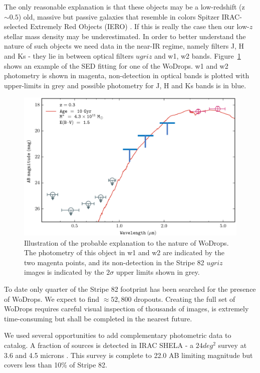 The only reasonable explanation is that these objects may be a low-redshift (z$\sim0.5$) old, massive but passive galaxies that resemble in colors Spitzer IRAC-selected Extremely Red Objects (IERO) \citep{Yan2004}. If this is really the case then our low-$z$ stellar mass density may be underestimated. In order to better understand the nature of such objects we need data in the near-IR regime, namely filters J, H and Ks - they lie in between optical filters $ugriz$ and w1, w2 bands. Figure~\ref{fig:wodrop_sed} shows an example of the SED fitting for one of the WoDrops. w1 and w2 photometry is shown in magenta, non-detection in optical bands is plotted with upper-limits in grey and possible photometry for J, H and Ks bands is in blue.

\begin{figure}[!ht]
\includegraphics[width=6in]{Figures/wodrop_sed.png}
\caption{Illustration of the probable explanation to the nature of WoDrops. The photometry of this object in w1 and w2 are indicated by the two magenta points, and its non-detection in the Stripe 82 $ugriz$ images is indicated by the $2\sigma$ upper limits shown in grey.}
\label{fig:wodrop_sed}
\end{figure}

To date only quarter of the Stripe 82 footprint has been searched for the presence of WoDrops. We expect to find $\approx52,800$ dropouts. Creating the full set of WoDrops requires careful visual inspection of thousands of images, is extremely time-consuming but shall be completed in the nearest future.

We used several opportunities to add complementary photometric data to catalog. A fraction of sources is detected in IRAC SHELA - a $24 deg^{2}$ survey at 3.6 and 4.5 microns \citep{Papovich2016}. This survey is complete to 22.0 AB limiting magnitude but covers less than 10\% of Stripe 82. 


